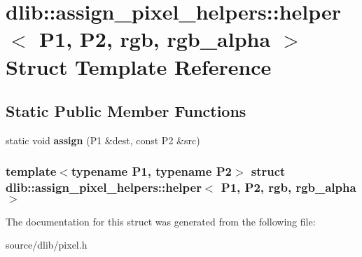 \hypertarget{structdlib_1_1assign__pixel__helpers_1_1helper_3_01P1_00_01P2_00_01rgb_00_01rgb__alpha_01_4}{
\section{dlib::assign\_\-pixel\_\-helpers::helper$<$ P1, P2, rgb, rgb\_\-alpha $>$ Struct Template Reference}
\label{structdlib_1_1assign__pixel__helpers_1_1helper_3_01P1_00_01P2_00_01rgb_00_01rgb__alpha_01_4}
}
\subsection*{Static Public Member Functions}
\begin{DoxyCompactItemize}
\item 
\hypertarget{structdlib_1_1assign__pixel__helpers_1_1helper_3_01P1_00_01P2_00_01rgb_00_01rgb__alpha_01_4_ad0f9a0bf5babf3419c7cabe5a54c8ee4}{
static void {\bfseries assign} (P1 \&dest, const P2 \&src)}
\label{structdlib_1_1assign__pixel__helpers_1_1helper_3_01P1_00_01P2_00_01rgb_00_01rgb__alpha_01_4_ad0f9a0bf5babf3419c7cabe5a54c8ee4}

\end{DoxyCompactItemize}
\subsubsection*{template$<$typename P1, typename P2$>$ struct dlib::assign\_\-pixel\_\-helpers::helper$<$ P1, P2, rgb, rgb\_\-alpha $>$}



The documentation for this struct was generated from the following file:\begin{DoxyCompactItemize}
\item 
source/dlib/pixel.h\end{DoxyCompactItemize}
